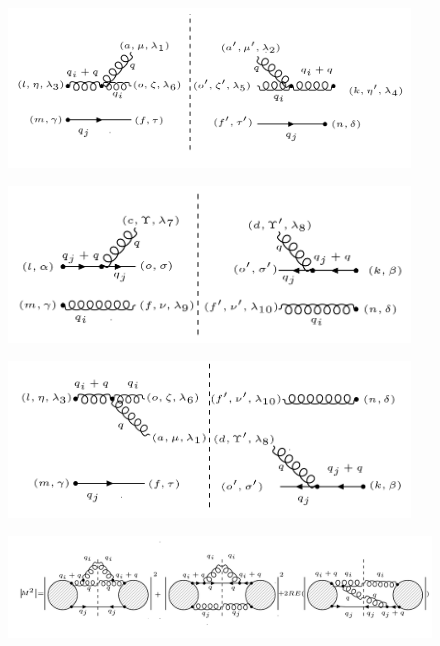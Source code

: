 \begin{figure}[ht!]
\centering
\includegraphics[width=0.95\textwidth]{images/ggqM1squer.png}
\end{figure}

\begin{figure}[ht!]
\centering
\includegraphics[width=0.95\textwidth]{images/qggM2squer.png}
\end{figure}

\begin{figure}[ht!]
\centering
\includegraphics[width=0.95\textwidth]{images/ggqM1M2dagger.png}
\end{figure}


\begin{figure}[ht!]
\centering
\includegraphics[width=1.0\textwidth]{images/ggq-MSquerRE.png}

\end{figure}